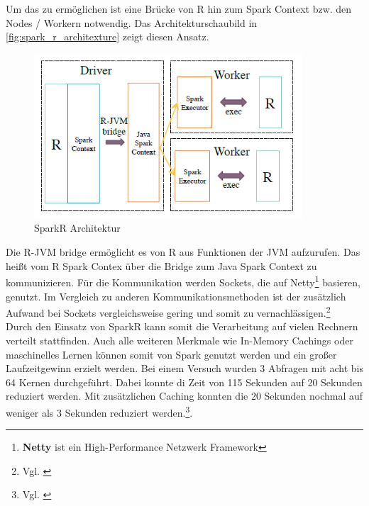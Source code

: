 \noindent
Um das zu ermöglichen ist eine Brücke von R hin zum Spark Context bzw. den Nodes / Workern notwendig. Das Architekturschaubild in \autoref{fig:spark_r_architexture} zeigt diesen Ansatz. 
\begin{figure}[h]
  \centering
  \includegraphics[width=100mm]{./bilder/spark_r_architecture.PNG}
  \caption{SparkR Architektur \cite{VYL+16}}\label{fig:spark_r_architexture}
\end{figure}
Die R-JVM bridge ermöglicht es von R aus Funktionen der JVM aufzurufen. Das heißt vom R Spark Contex über die Bridge zum Java Spark Context zu kommunizieren. Für die Kommunikation werden Sockets, die auf Netty\footnote{\textbf{Netty} ist ein High-Performance Netzwerk Framework} basieren, genutzt. Im Vergleich zu anderen Kommunikationsmethoden ist der zusätzlich Aufwand bei Sockets vergleichsweise gering und somit zu vernachlässigen.\footnote{Vgl. \cite{VYL+16}} \\

\noindent
Durch den Einsatz von SparkR kann somit die Verarbeitung auf vielen Rechnern verteilt stattfinden. Auch alle weiteren Merkmale wie In-Memory Cachings oder maschinelles Lernen können somit von Spark genutzt werden und ein großer Laufzeitgewinn erzielt werden. Bei einem Versuch wurden 3 Abfragen mit acht bis 64 Kernen durchgeführt. Dabei konnte di Zeit von 115 Sekunden auf 20 Sekunden reduziert werden. Mit zusätzlichen Caching konnten die 20 Sekunden nochmal auf weniger als 3 Sekunden reduziert werden.\footnote{Vgl. \cite{VYL+16}}.


